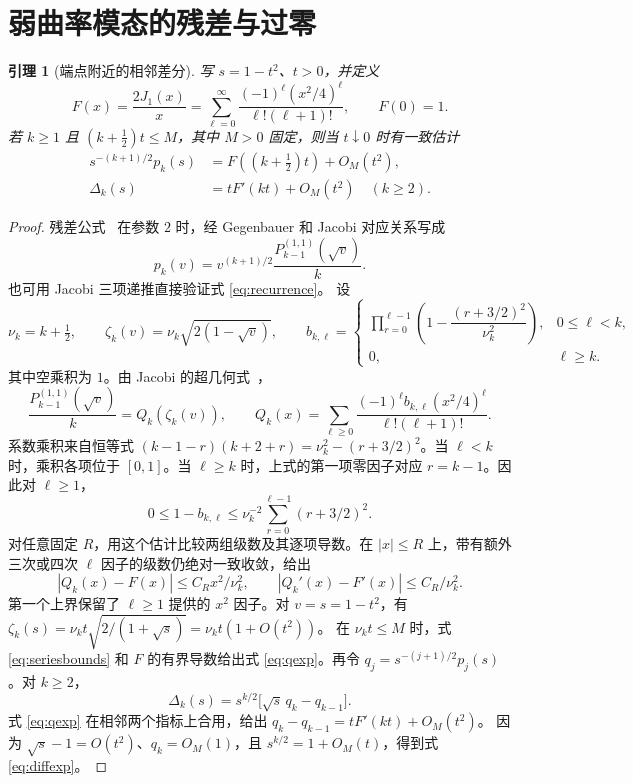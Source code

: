 \documentclass[11pt,a4paper,UTF8,fontset=fandol]{ctexart}
\newtheorem{lemma}[theorem]{引理}
\begin{document}
\section{弱曲率模态的残差与过零}
\begin{lemma}[端点附近的相邻差分]\label{lem:bessel}
写 \(s=1-t^2\)、\(t>0\)，并定义
\[
 F(x)=\frac{2J_1(x)}{x}
   =\sum_{\ell=0}^\infty\frac{(-1)^\ell(x^2/4)^\ell}{\ell!(\ell+1)!},
 \qquad F(0)=1 .
\]
若 \(k\ge1\) 且 \((k+\tfrac12)t\le M\)，其中 \(M>0\) 固定，则当 \(t\downarrow0\) 时有一致估计
\begin{align}
 s^{-(k+1)/2}p_k(s)&=F((k+\tfrac12)t)+O_M(t^2),\label{eq:qexp}\\
 \Delta_k(s)&=tF'(kt)+O_M(t^2)\quad (k\ge2).\label{eq:diffexp}
\end{align}
\end{lemma}
\begin{proof}
残差公式~\cite[定理 1]{kindermann} 在参数 \(2\) 时，经 Gegenbauer 和 Jacobi 对应关系写成
\begin{equation}
 p_k(v)=v^{(k+1)/2}\frac{P_{k-1}^{(1,1)}(\sqrt{v})}{k}.
 \label{eq:jacobi}
\end{equation}
也可用 Jacobi 三项递推直接验证式 \eqref{eq:recurrence}。
设
\[
 \nu_k=k+\tfrac12,\qquad
 \zeta_k(v)=\nu_k\sqrt{2(1-\sqrt{v})},\qquad
 b_{k,\ell}=
 \begin{cases}
 \prod_{r=0}^{\ell-1}\left(1-\dfrac{(r+3/2)^2}{\nu_k^2}\right),&0\le\ell<k,\\[3pt]
 0,&\ell\ge k .
 \end{cases}
\]
其中空乘积为 \(1\)。由 Jacobi 的超几何式~\cite[式 18.5.7]{dlmf}，
\begin{equation}
 \frac{P_{k-1}^{(1,1)}(\sqrt v)}{k}
   =Q_k(\zeta_k(v)),\qquad
 Q_k(x)=\sum_{\ell\ge0}
   \frac{(-1)^\ell b_{k,\ell}(x^2/4)^\ell}{\ell!(\ell+1)!}.
 \label{eq:product}
\end{equation}
系数乘积来自恒等式
\((k-1-r)(k+2+r)=\nu_k^2-(r+3/2)^2\)。当 \(\ell<k\) 时，乘积各项位于 \([0,1]\)。当 \(\ell\ge k\) 时，上式的第一项零因子对应 \(r=k-1\)。因此对 \(\ell\ge1\)，
\[
 0\le1-b_{k,\ell}
 \le \nu_k^{-2}\sum_{r=0}^{\ell-1}(r+3/2)^2 .
\]
对任意固定 \(R\)，用这个估计比较两组级数及其逐项导数。在 \(|x|\le R\) 上，带有额外三次或四次 \(\ell\) 因子的级数仍绝对一致收敛，给出
\begin{equation}
 |Q_k(x)-F(x)|\le C_R x^2/\nu_k^2,\qquad
 |Q_k'(x)-F'(x)|\le C_R/\nu_k^2.
 \label{eq:seriesbounds}
\end{equation}
第一个上界保留了 \(\ell\ge1\) 提供的 \(x^2\) 因子。对 \(v=s=1-t^2\)，有
\(\zeta_k(s)=\nu_k t \sqrt{2/(1+\sqrt{s})}=\nu_k t(1+O(t^2))\)。
在 \(\nu_k t\le M\) 时，式 \eqref{eq:seriesbounds} 和 \(F\) 的有界导数给出式 \eqref{eq:qexp}。再令
\(q_j=s^{-(j+1)/2}p_j(s)\)。对 \(k\ge2\)，
\[
 \Delta_k(s)=s^{k/2}\big[\sqrt{s}\,q_k-q_{k-1}\big].
\]
式 \eqref{eq:qexp} 在相邻两个指标上合用，给出
\(q_k-q_{k-1}=tF'(kt)+O_M(t^2)\)。
因为 \(\sqrt{s}-1=O(t^2)\)、\(q_k=O_M(1)\)，且 \(s^{k/2}=1+O_M(t)\)，得到式 \eqref{eq:diffexp}。
\end{proof}
\end{document}
